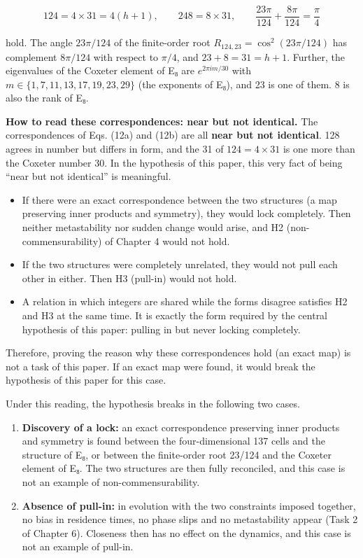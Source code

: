 \documentclass[
  a4paper,
]{article}
\providecommand{\tightlist}{%
  \setlength{\itemsep}{0pt}\setlength{\parskip}{0pt}}
\begin{document}
\[
124=4\times31=4(h+1),\qquad 248=8\times31,\qquad \frac{23\pi}{124}+\frac{8\pi}{124}=\frac{\pi}{4}
\tag{12b}
\]

hold. The angle \(23\pi/124\) of the finite-order root
\(R_{124,23}=\cos^2(23\pi/124)\) has complement \(8\pi/124\) with
respect to \(\pi/4\), and \(23+8=31=h+1\). Further, the eigenvalues of
the Coxeter element of E₈ are \(e^{2\pi i m/30}\) with
\(m\in\{1,7,11,13,17,19,23,29\}\) (the exponents of E₈), and 23 is one
of them. 8 is also the rank of E₈.

\textbf{How to read these correspondences: near but not identical.} The
correspondences of Eqs. (12a) and (12b) are all \textbf{near but not
identical}. 128 agrees in number but differs in form, and the 31 of
\(124=4\times31\) is one more than the Coxeter number 30. In the
hypothesis of this paper, this very fact of being ``near but not
identical'' is meaningful.

\begin{itemize}
\tightlist
\item
  If there were an exact correspondence between the two structures (a
  map preserving inner products and symmetry), they would lock
  completely. Then neither metastability nor sudden change would arise,
  and H2 (non-commensurability) of Chapter 4 would not hold.
\item
  If the two structures were completely unrelated, they would not pull
  each other in either. Then H3 (pull-in) would not hold.
\item
  A relation in which integers are shared while the forms disagree
  satisfies H2 and H3 at the same time. It is exactly the form required
  by the central hypothesis of this paper: pulling in but never locking
  completely.
\end{itemize}

Therefore, proving the reason why these correspondences hold (an exact
map) is not a task of this paper. If an exact map were found, it would
break the hypothesis of this paper for this case.

Under this reading, the hypothesis breaks in the following two cases.

\begin{enumerate}
\def\labelenumi{\arabic{enumi}.}
\tightlist
\item
  \textbf{Discovery of a lock:} an exact correspondence preserving inner
  products and symmetry is found between the four-dimensional 137 cells
  and the structure of E₈, or between the finite-order root 23/124 and
  the Coxeter element of E₈. The two structures are then fully
  reconciled, and this case is not an example of non-commensurability.
\item
  \textbf{Absence of pull-in:} in evolution with the two constraints
  imposed together, no bias in residence times, no phase slips and no
  metastability appear (Task 2 of Chapter 6). Closeness then has no
  effect on the dynamics, and this case is not an example of pull-in.
\end{enumerate}
\end{document}
